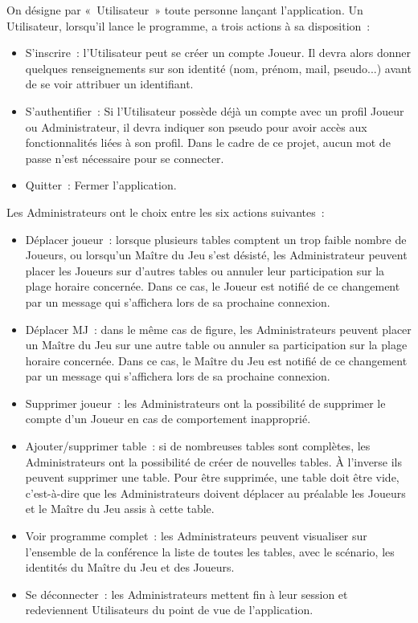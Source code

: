 \documentclass[11pt]{article}
\begin{document}
On désigne par «~Utilisateur~» toute personne lançant l'application. Un Utilisateur, lorsqu'il lance le programme, a trois actions à sa disposition~:
\begin{itemize}
    \item{S'inscrire~: l'Utilisateur peut se créer un compte Joueur. Il devra alors donner quelques renseignements sur son identité (nom, prénom, mail, pseudo...) avant de se voir attribuer un identifiant.}
    \item{S'authentifier~: Si l'Utilisateur possède déjà un compte avec un profil Joueur ou Administrateur, il devra indiquer son pseudo pour avoir accès aux fonctionnalités liées à son profil. Dans le cadre de ce projet, aucun mot de passe n'est nécessaire pour se connecter.}
    \item{Quitter~:  Fermer l'application.\\}
\end{itemize}

Les Administrateurs ont le choix entre les six actions suivantes~:
\begin{itemize}
    \item {Déplacer joueur~: lorsque plusieurs tables comptent un trop faible nombre de Joueurs, ou lorsqu'un Maître du Jeu s'est désisté, les Administrateur peuvent placer les Joueurs sur d'autres tables ou annuler leur participation sur la plage horaire concernée. Dans ce cas, le Joueur est notifié de ce changement par un message qui s'affichera lors de sa prochaine connexion.}
    \item{Déplacer MJ~: dans le même cas de figure, les Administrateurs peuvent placer un Maître du Jeu sur une autre table ou annuler sa participation sur la plage horaire concernée. Dans ce cas, le Maître du Jeu est notifié de ce changement par un message qui s'affichera lors de sa prochaine connexion.}
    \item{Supprimer joueur~: les Administrateurs ont la possibilité de supprimer le compte d'un Joueur en cas de comportement inapproprié.}
    \item{Ajouter/supprimer table~: si de nombreuses tables sont complètes, les Administrateurs ont la possibilité de créer de nouvelles tables. À l'inverse ils peuvent supprimer une table. Pour être supprimée, une table doit être vide, c'est-à-dire que les Administrateurs doivent déplacer au préalable les Joueurs et le Maître du Jeu assis à cette table.}
    \item{Voir programme complet~: les Administrateurs peuvent visualiser sur l'ensemble de la conférence la liste de toutes les tables, avec le scénario, les identités du Maître du Jeu et des Joueurs.}
    \item{Se déconnecter~: les Administrateurs mettent fin à leur session et redeviennent Utilisateurs du point de vue de l'application.\\}
\end{itemize}
\end{document}
